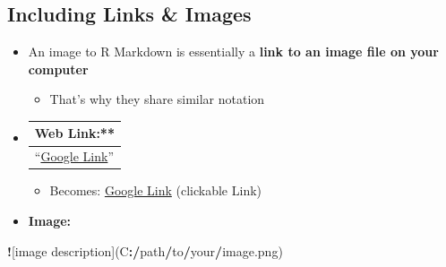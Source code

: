 \documentclass[
]{book}
\newenvironment{Shaded}{\begin{snugshade}}{\end{snugshade}}
\newcommand{\ErrorTok}[1]{\textcolor[rgb]{0.64,0.00,0.00}{\textbf{#1}}}
\newcommand{\NormalTok}[1]{#1}
\newcommand{\SpecialCharTok}[1]{\textcolor[rgb]{0.81,0.36,0.00}{\textbf{#1}}}
\providecommand{\tightlist}{%
  \setlength{\itemsep}{0pt}\setlength{\parskip}{0pt}}
\begin{document}
\subsection{Including Links \& Images}\label{including-links-images}

\begin{itemize}
\item
  An image to R Markdown is essentially a \textbf{link to an image file on your computer}

  \begin{itemize}
  \tightlist
  \item
    That's why they share similar notation
  \end{itemize}
\item
  \begin{longtable}[]{@{}l@{}}
  \toprule\noalign{}
  Web Link:** \\
  \midrule\noalign{}
  \endhead
  \bottomrule\noalign{}
  \endlastfoot
  ``\href{www.google.com}{Google Link}'' \\
  \end{longtable}

  \begin{itemize}
  \tightlist
  \item
    Becomes: \href{https://www.google.com/}{Google Link} (clickable Link)
  \end{itemize}
\item
  \textbf{Image:}
\end{itemize}

\begin{Shaded}
\begin{Highlighting}[]
\SpecialCharTok{!}\NormalTok{[image description](C}\SpecialCharTok{:}\ErrorTok{/}\NormalTok{path}\SpecialCharTok{/}\NormalTok{to}\SpecialCharTok{/}\NormalTok{your}\SpecialCharTok{/}\NormalTok{image.png)}
\end{Highlighting}
\end{Shaded}
\end{document}
